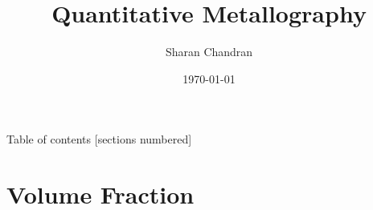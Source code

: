\documentclass[10pt]{beamer}
\title{Quantitative Metallography}
\date{\today}
\author{Sharan Chandran}
\institute{Indian Institute of Science}
\begin{document}
\graphicspath{{../Images/}} 

\maketitle


\begin{frame}{Table of contents}
  [sections numbered]
  \tableofcontents[hideallsubsections]
\end{frame}

\section{Volume Fraction}
\end{document}
